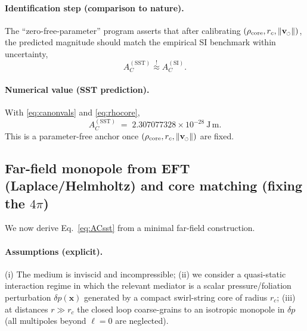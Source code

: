 \documentclass[pdflatex,sn-mathphys-num]{revtex4-2}
\newcommand{\swirlarrow}{\mathchoice{\mkern-2mu\scriptstyle\boldsymbol{\circlearrowleft}}{\mkern-2mu\scriptstyle\boldsymbol{\circlearrowleft}}{\mkern-2mu\scriptscriptstyle\boldsymbol{\circlearrowleft}}{\mkern-2mu\scriptscriptstyle\boldsymbol{\circlearrowleft}}}
\newcommand{\rhocore}{\rho_{\text{core}}}
\newcommand{\vswirl}{\mathbf{v}_{\swirlarrow}}
\newcommand{\vnorm}{\lVert \vswirl \rVert}
\providecommand{\rc}{r_c}
\begin{document}
    \paragraph{Identification step (comparison to nature).}
        The ``zero-free-parameter'' program asserts that after calibrating \((\rhocore,\rc,\vnorm)\),
        the predicted magnitude should match the empirical SI benchmark within uncertainty,
        \begin{equation}
            A_C^{\mathrm{(SST)}} \stackrel{!}{\approx} A_C^{\mathrm{(SI)}}.
            \label{eq:AC_identification}
        \end{equation}

    \paragraph{Numerical value (SST prediction).}
        With \eqref{eq:canonvals} and \eqref{eq:rhocore},
        \begin{equation}
            A_C^{\mathrm{(SST)}} \;=\; 2.307077328\times 10^{-28}\ \mathrm{J\,m}.
            \label{eq:ACnum}
        \end{equation}
        This is a parameter-free anchor once \((\rhocore,\rc,\vnorm)\) are fixed.

    \subsection{Far-field monopole from EFT (Laplace/Helmholtz) and core matching (fixing the \(4\pi\))}
    \label{sec:ACderive}

    We now derive Eq.~\eqref{eq:ACsst} from a minimal far-field construction.

    \paragraph{Assumptions (explicit).}
        (i) The medium is inviscid and incompressible; (ii) we consider a quasi-static interaction regime
        in which the relevant mediator is a scalar pressure/foliation perturbation \(\delta p(\mathbf{x})\)
        generated by a compact swirl-string core of radius \(\rc\); (iii) at distances \(r\gg \rc\) the closed loop
        coarse-grains to an isotropic monopole in \(\delta p\) (all multipoles beyond \(\ell=0\) are neglected).
\end{document}

